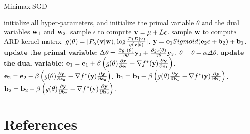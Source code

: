 \documentclass{article}
\def\e{{\bf e}}
\def\b{{\bf b}}
\def\v{{\bf v}}
\def\y{{\bf y}}
\def\w{{\bf w}}
\begin{document}
\begin{algorithm}[!t]
    \caption{Minimax SGD}
    \label{algorithm_vrkm_plus_plus}
    \begin{algorithmic}[1]
        \State initialize all hyper-parameters, and initialize the primal variable $\theta$ and the dual variables $\w_1$ and $\w_2$.
        \State sample $\epsilon$ to compute $\v=\mu+L\epsilon$.
        \State sample $\w$ to compute ARD kernel matrix.
        \State $g(\theta) = [P_{\alpha}(\v|\w), \log\frac{P(D|\v)}{q(\v|\theta)}]$.
        \State $\y=\e_1 Sigmoid( \e_2 \epsilon + \b_2) + \b_1$.
        \State \textbf{update the primal variable:} 
        \State $\Delta \theta = \frac{\partial g_1(\theta) }{\partial \theta} \y_1 + \frac{\partial g_2(\theta) }{\partial \theta} \y_2$.
        \State $\theta = \theta - \alpha \Delta \theta$.
        \State \textbf{update the dual variable:} 
        \State $\e_1 = \e_1 + \beta \left (g(\theta)\frac{\partial \y}{\partial \e_1} - \nabla f^{\ast}(\y) \frac{\partial \y}{\partial \e_1} \right)$.
        \State $\e_2 = \e_2 + \beta \left (g(\theta)\frac{\partial \y}{\partial \e_2} - \nabla f^{\ast}(\y) \frac{\partial \y}{\partial \e_2} \right)$.
        \State $\b_1 = \b_1 + \beta \left ( g(\theta)\frac{\partial \y}{\partial \b_1} - \nabla f^{\ast}(\y) \frac{\partial \y}{\partial \b_1}\right)$.
        \State $\b_2 = \b_2 + \beta \left ( g(\theta)\frac{\partial \y}{\partial \b_2} - \nabla f^{\ast}(\y) \frac{\partial \y}{\partial \b_2}\right)$.
        \EndFor
    \end{algorithmic}
\end{algorithm}







\section*{References}



\end{document}
